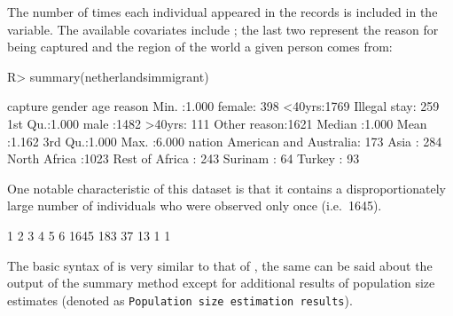 \documentclass[
]{jss}
\newcommand{\1}{\mathcal{I}} \newcommand{\bZero}{\boldsymbol{0}}
\begin{document}
The number of times each individual appeared in the records is included
in the  variable. The available covariates include
; the last two represent the reason
for being captured and the region of the world a given person comes
from:

\begin{CodeChunk}
\begin{CodeInput}
R> summary(netherlandsimmigrant)
\end{CodeInput}
\begin{CodeOutput}
    capture         gender         age                reason    
 Min.   :1.000   female: 398   <40yrs:1769   Illegal stay: 259  
 1st Qu.:1.000   male  :1482   >40yrs: 111   Other reason:1621  
 Median :1.000                                                  
 Mean   :1.162                                                  
 3rd Qu.:1.000                                                  
 Max.   :6.000                                                  
                    nation    
 American and Australia: 173  
 Asia                  : 284  
 North Africa          :1023  
 Rest of Africa        : 243  
 Surinam               :  64  
 Turkey                :  93  
\end{CodeOutput}
\end{CodeChunk}

One notable characteristic of this dataset is that it contains a
disproportionately large number of individuals who were observed only
once (i.e.~1645).

\begin{CodeChunk}
\begin{CodeOutput}

   1    2    3    4    5    6 
1645  183   37   13    1    1 
\end{CodeOutput}
\end{CodeChunk}

The basic syntax of  is very similar to that of
, the same can be said about the output of the summary method
except for additional results of population size estimates (denoted as
\texttt{Population size estimation results}).
\end{document}
